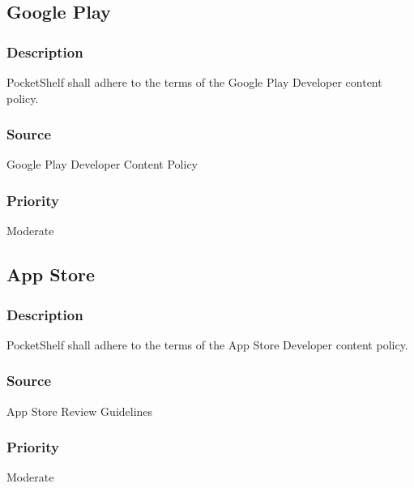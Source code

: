 \subsection{Google Play}
\subsubsection{Description}
PocketShelf shall adhere to the terms of the Google Play Developer content policy.
\subsubsection{Source}
 Google Play Developer Content Policy 
\subsubsection{Priority}
Moderate\\


\subsection{App Store}
\subsubsection{Description}
PocketShelf shall adhere to the terms of the App Store Developer content policy.
\subsubsection{Source}
App Store Review Guidelines

\subsubsection{Priority}
Moderate